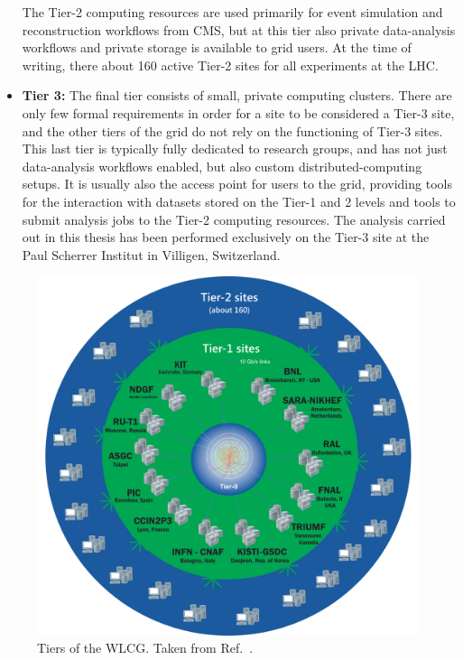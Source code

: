 \begin{itemize}
% 
The Tier-2 computing resources are used primarily for event simulation and reconstruction workflows from CMS, but at this tier also private data-analysis workflows and private storage is available to grid users.
% 
At the time of writing, there about 160 active Tier-2 sites for all experiments at the LHC.
% 
\item \textbf{Tier 3:} The final tier consists of small, private computing clusters.
% 
There are only few formal requirements in order for a site to be considered a Tier-3 site, and the other tiers of the grid do not rely on the functioning of Tier-3 sites.
% 
This last tier is typically fully dedicated to research groups, and has not just data-analysis workflows enabled, but also custom distributed-computing setups.
% 
It is usually also the access point for users to the grid, providing tools for the interaction with datasets stored on the Tier-1 and 2 levels and tools to submit analysis jobs to the Tier-2 computing resources.
% 
The analysis carried out in this thesis has been performed exclusively on the Tier-3 site at the Paul Scherrer Institut in Villigen, Switzerland.
% 
\end{itemize}


\begin{figure}[hbtp]
  \begin{center}
    \includegraphics[width=0.7\linewidth]{img/detector/wlcg.png}
    \caption{
        Tiers of the WLCG. Taken from Ref.~\cite{wlcgwebsite}.
        }
    \label{fig:wlcg}
  \end{center}
\end{figure}

